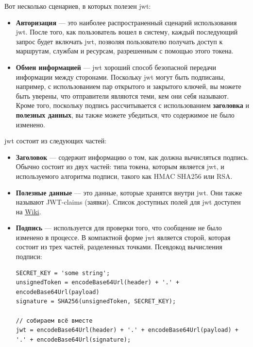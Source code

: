 Вот несколько сценариев, в которых полезен \acrshort{jwt}:
\begin{itemize}
    \item \textbf{Авторизация} --- это наиболее распространенный сценарий использования \acrshort{jwt}. После того, как пользователь вошел в систему, каждый последующий запрос будет включать \acrshort{jwt}, позволяя пользователю получать доступ к маршрутам, службам и ресурсам, разрешенным с помощью этого токена.
    \item \textbf{Обмен информацией} --- \acrshort{jwt} хороший способ безопасной передачи информации между сторонами. Поскольку \acrshort{jwt} могут быть подписаны, например, с использованием пар открытого и закрытого ключей, вы можете быть уверены, что отправители являются теми, кем они себя называют. Кроме того, поскольку подпись рассчитывается с использованием \textbf{заголовка} и \textbf{полезных данных}, вы также можете убедиться, что содержимое не было изменено.
\end{itemize}

\acrshort{jwt} состоит из следующих частей:
\begin{itemize}
    \item \textbf{Заголовок} ---  содержит информацию о том, как должна вычисляться подпись. Обычно состоит из двух частей: типа токена, которым является \acrshort{jwt}, и используемого алгоритма подписи, такого как HMAC SHA256 или RSA.
    \item \textbf{Полезные данные} --- это данные, которые хранятся внутри \acrshort{jwt}. Они также называют JWT-claims (заявки). Список доступных полей для \acrshort{jwt} доступен на \href{https://en.wikipedia.org/wiki/JSON_Web_Token#Standard_fields}{Wiki}.
    \item \textbf{Подпись} --- используется для проверки того, что сообщение не было изменено в процессе. В компактной форме \acrshort{jwt} является сторой, которая состоит из трех частей, разделенных точками. Псевдокод вычисления подписи:
    \begin{noerr}
    \begin{verbatim}
SECRET_KEY = 'some string';
unsignedToken = encodeBase64Url(header) + '.' + encodeBase64Url(payload)
signature = SHA256(unsignedToken, SECRET_KEY);

// собираем всё вместе
jwt = encodeBase64Url(header) + '.' + encodeBase64Url(payload) + '.' + encodeBase64Url(signature);
    \end{verbatim}
    \end{noerr}
\end{itemize}



\clearpage